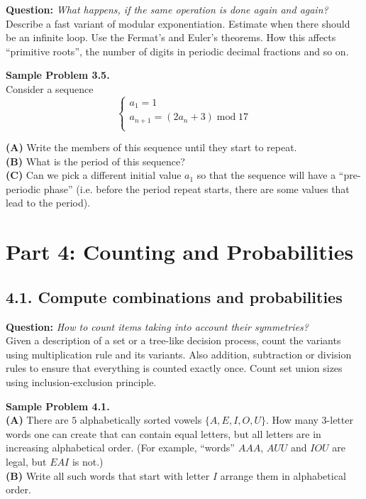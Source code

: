 \documentclass[jou]{apa6}
\begin{document}
{\bf Question:} {\em What happens, if the same operation is done again and again?}\\
{\scriptsize 
Describe a fast variant of modular exponentiation. 
Estimate when there should be an infinite loop. Use the Fermat’s and Euler’s theorems. 
How this affects ``primitive roots'', the number of digits in periodic decimal fractions and so on. 
}


\vspace{6pt}
{\bf Sample Problem 3.5.}\\
Consider a sequence
$$\left\{ \begin{array}{l}
a_1 = 1\\
a_{n+1} = (2a_n + 3)\;\text{mod}\;17\\
\end{array} \right.$$

{\bf (A)} Write the members of this sequence until they start to repeat.\\
{\bf (B)} What is the period of this sequence?\\
{\bf (C)} Can we pick a different initial value $a_1$ so that the sequence will 
have a ``pre-periodic phase'' (i.e. before the period repeat starts, there 
are some values that lead to the period).




\newpage
\section{Part 4: Counting and Probabilities}

\subsection{4.1. Compute combinations and probabilities}

{\bf Question:} {\em How to count items taking into account their symmetries?}\\
{\scriptsize 
Given a description of a set or a tree-like decision process, 
count the variants using multiplication rule and its variants. 
Also addition, subtraction or division rules \textendash{} to ensure that 
everything is counted exactly once. 
Count set union sizes using inclusion-exclusion principle.
}

\vspace{6pt}
{\bf Sample Problem 4.1.}\\ 
{\bf (A)} There are $5$ alphabetically sorted vowels $\{ A, E, I, O, U \}$. 
How many $3$-letter words one can create that can contain equal letters, 
but all letters are in increasing alphabetical order. 
(For example, ``words'' $AAA$, $AUU$ and $IOU$ are legal, but $EAI$ is not.)\\
{\bf (B)} Write all such words that start with letter $I$ \textendash{} 
arrange them in alphabetical order.
\end{document}
